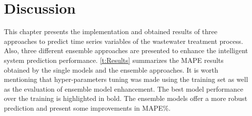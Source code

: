 \section{Discussion}
\label{s:Contribution-2-Summary}

This chapter presents the implementation and obtained results of three approaches to predict time series variables of the wastewater treatment process. Also, three different ensemble approaches are presented to enhance the intelligent system prediction performance.
\autoref{t:Results} summarizes the \ac{MAPE} results obtained by the single models and the ensemble approaches. It is worth mentioning that hyper-parameters tuning was made using the training set as well as the evaluation of ensemble model enhancement. The best model performance over the training is highlighted in bold. The ensemble models offer a more robust prediction and present some improvements in \ac{MAPE}\%.

